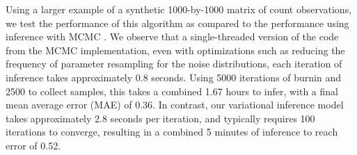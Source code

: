 \documentclass[letterpaper]{article}
\begin{document}
  Using a larger example of a synthetic 1000-by-1000 matrix of count
  observations, we test the performance of this algorithm as compared to the
  performance using inference with MCMC \citep{schein2018locally}. We observe
  that a single-threaded version of the code from the MCMC implementation, even
  with optimizations such as reducing the frequency of parameter resampling for
  the noise distributions, each iteration of inference takes approximately 0.8
  seconds. Using 5000 iterations of burnin and 2500 to collect samples, this
  takes a combined 1.67 hours to infer, with a final mean average error (MAE) of
  0.36. In contrast, our variational inference model takes approximately 2.8
  seconds per iteration, and typically requires 100 iterations to converge,
  resulting in a combined 5 minutes of inference to reach error of 0.52.  
\end{document}
